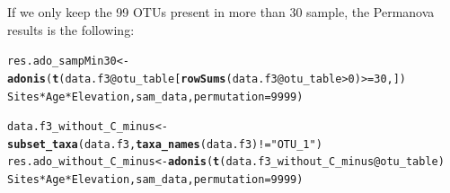 \documentclass[12pt]{article}\usepackage[]{graphicx}\usepackage[]{color}
\makeatletter
\newcommand{\hlnum}[1]{\textcolor[rgb]{0.686,0.059,0.569}{#1}}%
\newcommand{\hlstr}[1]{\textcolor[rgb]{0.192,0.494,0.8}{#1}}%
\newcommand{\hlopt}[1]{\textcolor[rgb]{0,0,0}{#1}}%
\newcommand{\hlstd}[1]{\textcolor[rgb]{0.345,0.345,0.345}{#1}}%
\newcommand{\hlkwb}[1]{\textcolor[rgb]{0.69,0.353,0.396}{#1}}%
\newcommand{\hlkwc}[1]{\textcolor[rgb]{0.333,0.667,0.333}{#1}}%
\newcommand{\hlkwd}[1]{\textcolor[rgb]{0.737,0.353,0.396}{\textbf{#1}}}%
\newenvironment{kframe}{%
 \def\at@end@of@kframe{}%
 \ifinner\ifhmode%
  \def\at@end@of@kframe{\end{minipage}}%
  \begin{minipage}{\columnwidth}%
 \fi\fi%
 \def\FrameCommand##1{\hskip\@totalleftmargin \hskip-\fboxsep
 \colorbox{shadecolor}{##1}\hskip-\fboxsep
     \hskip-\linewidth \hskip-\@totalleftmargin \hskip\columnwidth}%
 \MakeFramed {\advance\hsize-\width
   \@totalleftmargin\z@ \linewidth\hsize
   \@setminipage}}%
 {\par\unskip\endMakeFramed%
 \at@end@of@kframe}
\newenvironment{knitrout}{}{} %
\numberwithin{figure}{section}
\makeatother
\begin{document}
If we only keep the 99 OTUs present in more than 30 sample, the Permanova results is the following:
\begin{knitrout}\small
{}\color{fgcolor}\begin{kframe}
\begin{alltt}
\hlstd{res.ado_sampMin30} \hlkwb{<-} \hlkwd{adonis}\hlstd{(}\hlkwd{t}\hlstd{(data.f3}\hlopt{@}\hlkwc{otu_table}\hlstd{[}\hlkwd{rowSums}\hlstd{(data.f3}\hlopt{@}\hlkwc{otu_table}\hlopt{>}\hlnum{0}\hlstd{)}\hlopt{>=}\hlnum{30}\hlstd{,])} \hlopt{~}
                              \hlstd{Sites} \hlopt{*} \hlstd{Age} \hlopt{*} \hlstd{Elevation, sam_data,} \hlkwc{permutation} \hlstd{=} \hlnum{9999}\hlstd{)}
\end{alltt}
\end{kframe}
\end{knitrout}

\begin{knitrout}\small
{}\color{fgcolor}\begin{kframe}
\begin{alltt}
\hlstd{data.f3_without_C_minus} \hlkwb{<-} \hlkwd{subset_taxa}\hlstd{(data.f3,} \hlkwd{taxa_names}\hlstd{(data.f3)}\hlopt{!=}\hlstr{"OTU_1"}\hlstd{)}
\hlstd{res.ado_without_C_minus} \hlkwb{<-} \hlkwd{adonis}\hlstd{(}\hlkwd{t}\hlstd{(data.f3_without_C_minus}\hlopt{@}\hlkwc{otu_table}\hlstd{)} \hlopt{~}
                              \hlstd{Sites} \hlopt{*} \hlstd{Age} \hlopt{*} \hlstd{Elevation, sam_data,} \hlkwc{permutation} \hlstd{=} \hlnum{9999}\hlstd{)}
\end{alltt}
\end{kframe}
\end{knitrout}
\end{document}
